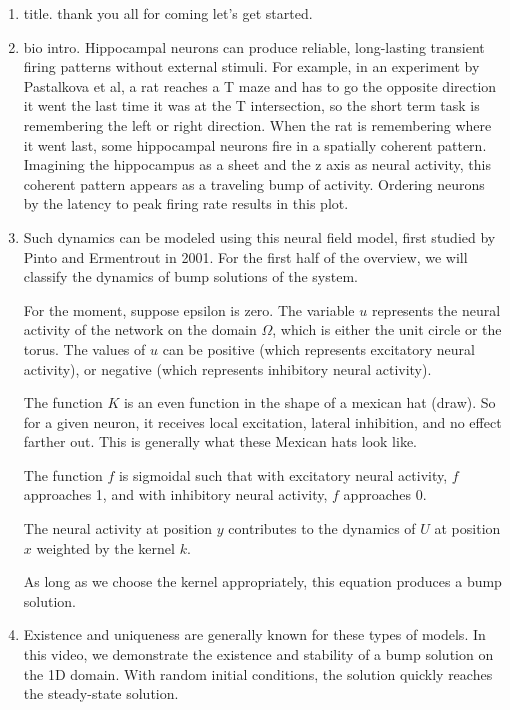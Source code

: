 \documentclass[a4paper,14pt]{article}
\begin{document}
\begin{enumerate}
 \item title. thank you all for coming let's get started.
 \item bio intro. Hippocampal neurons can produce reliable, long-lasting transient firing patterns without external stimuli. For example, in an experiment by Pastalkova et al, a rat reaches a T maze and has to go the opposite direction it went the last time it was at the T intersection, so the short term task is remembering the left or right direction. When the rat is remembering where it went last, some hippocampal neurons fire in a spatially coherent pattern. Imagining the hippocampus as a sheet and the z axis as neural activity, this coherent pattern appears as a traveling bump of activity. Ordering neurons by the latency to peak firing rate results in this plot.
 
 \item Such dynamics can be modeled using this neural field model, first studied by Pinto and Ermentrout in 2001. For the first half of the overview, we will classify the dynamics of bump solutions of the system.
 
 For the moment, suppose epsilon is zero. The variable $u$ represents the neural activity of the network on the domain $\Omega$, which is either the unit circle or the torus.  The values of $u$ can be positive (which represents excitatory neural activity), or negative (which represents inhibitory neural activity).
 
 The function $K$ is an even function in the shape of a mexican hat (draw). So for a given neuron, it receives local excitation, lateral inhibition, and no effect farther out. This is generally what these Mexican hats look like.
 
 The function $f$ is sigmoidal such that with excitatory neural activity, $f$ approaches 1, and with inhibitory neural activity, $f$ approaches 0.
 
 The neural activity at position $y$ contributes to the dynamics of $U$ at position $x$ weighted by the kernel $k$.
 
 As long as we choose the kernel appropriately, this equation produces a bump solution.
 
 \item Existence and uniqueness are generally known for these types of models. In this video, we demonstrate the existence and stability of a bump solution on the 1D domain. With random initial conditions, the solution quickly reaches the steady-state solution.
 

\end{enumerate}
\end{document}
